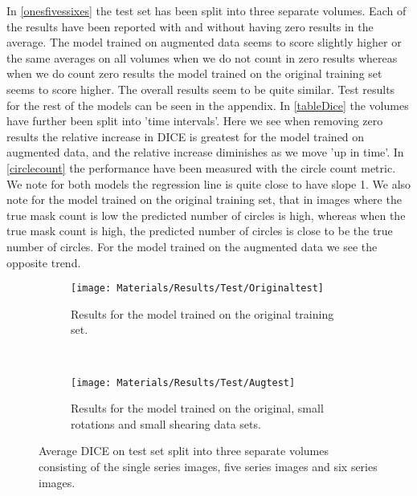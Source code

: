 In \autoref{onesfivessixes} the test set has been split into three separate volumes. Each of the results have been reported with and without having zero results in the average. The model trained on augmented data seems to score slightly higher or the same averages on all volumes when we do not count in zero results whereas when we do count zero results the model trained on the original training set seems to score higher. The overall results seem to be quite similar. Test results for the rest of the models can be seen in the appendix. In \autoref{tableDice} the volumes have further been split into 'time intervals'. Here we see when removing zero results the relative increase in DICE is greatest for the model trained on augmented data, and the relative increase diminishes as we move 'up in time'. In \autoref{circlecount} the performance have been measured with the circle count metric. We note for both models the regression line is quite close to have slope 1. We also note for the model trained on the original training set, that in images where the true mask count is low the predicted number of circles is high, whereas when the true mask count is high, the predicted number of circles is close to be the true number of circles. For the model trained on the augmented data we see the opposite trend.

\begin{figure}
	\centering
	\begin{subfigure}[b]{\linewidth}
		\centering
		\texttt{[image: Materials/Results/Test/Originaltest]}
		\caption{Results for the model trained on the original training set.}
	\end{subfigure}
	\\
	\begin{subfigure}[b]{\linewidth}
		\centering
		\texttt{[image: Materials/Results/Test/Augtest]}
		\caption{Results for the model trained on the original, small rotations and small shearing data sets.}
	\end{subfigure}
	\caption{Average DICE on test set split into three separate volumes consisting of the single series images, five series images and six series images.}
	\label{onesfivessixes}
\end{figure}

